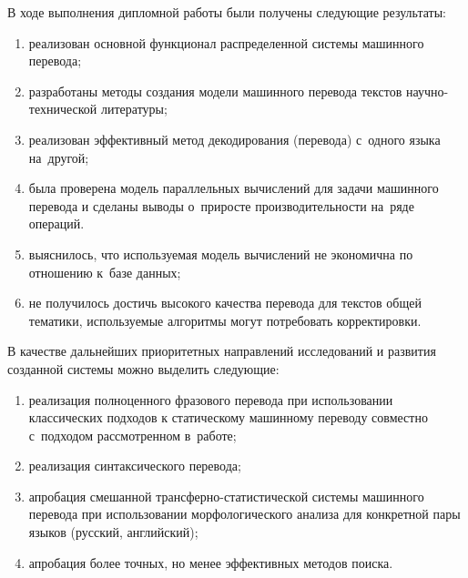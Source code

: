 

В ходе выполнения дипломной работы были получены следующие результаты:

{\renewcommand{\labelenumi}{\alph{enumi})}
	\begin{enumerate}
		\item реализован основной функционал распределенной системы машинного перевода;
		\item разработаны методы создания модели машинного перевода текстов научно-технической литературы;
		\item реализован эффективный метод декодирования (перевода) с~одного языка на~другой;
		\item была проверена модель параллельных вычислений для задачи машинного перевода
			и сделаны выводы о~приросте производительности на~ряде операций. 
		\item выяснилось, что используемая модель вычислений не экономична 
			по отношению к~базе данных;
		\item не получилось достичь высокого качества перевода для текстов общей тематики, 
			используемые алгоритмы могут потребовать корректировки.
	\end{enumerate}
}
В качестве дальнейших приоритетных направлений исследований 
и развития созданной системы можно выделить следующие:
{\renewcommand{\labelenumi}{\alph{enumi})}
	\begin{enumerate}
		\item реализация полноценного фразового перевода
			при использовании классических подходов 
				к статическому машинному переводу совместно с~подходом рассмотренном в~работе;
		\item реализация синтаксического перевода;
		\item апробация смешанной трансферно-статистической системы машинного перевода 
			при использовании морфологического анализа для конкретной пары языков (русский, английский);
		\item апробация более точных, но менее эффективных методов поиска.
	\end{enumerate}
}
